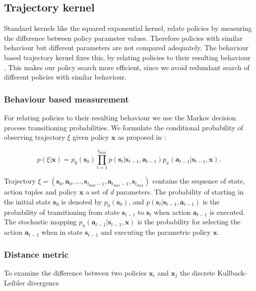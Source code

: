 \subsection{Trajectory kernel}\label{sec:trajKernel}
Standard kernels like the squared exponential kernel, relate policies by measuring the difference between policy parameter values. Therefore policies with similar behaviour but different parameters are not compared adequately. The behaviour based trajectory kernel fixes this, by relating policies to their resulting behaviour \cite{wilson2014using}. This makes our policy search more efficient, since we avoid redundant search of different policies with similar behaviour.

\subsubsection{Behaviour based measurement}

For relating policies to their resulting behaviour we use the Markov decision process transitioning probabilities. We formulate the conditional probability of observing trajectory $\xi$ given policy $\mathbf{x}$ as proposed in \cite{wilson2014using}:

$$p(\xi|\mathbf{x}) = p_{0}(\mathbf{s}_{0}) \prod_{t=1}^{t_\mathrm{max}} p(\mathbf{s}_{t}|\mathbf{s}_{t-1}, \mathbf{a}_{t-1}) p_{\pi}(\mathbf{a}_{t-1}|\mathbf{s}_{t-1}, \mathbf{x}).$$

Trajectory $\xi=(\mathbf{s}_{0},\mathbf{a}_{0}, ..., \mathbf{s}_{t_\mathrm{max}-1}, \mathbf{a}_{t_\mathrm{max}-1}, \mathbf{s}_{t_\mathrm{max}})$ contains the sequence of state, action tuples and policy $\mathbf{x}$ a set of $d$ parameters. The probability of starting in the initial state $\mathbf{s}_{0}$ is denoted by $p_{0}(\mathbf{s}_{0})$, and $p(\mathbf{s}_{t}|\mathbf{s}_{t-1}, \mathbf{a}_{t-1})$ is the probability of transitioning from state $\mathbf{s}_{t-1}$ to $\mathbf{s}_{t}$ when action $\mathbf{a}_{t-1}$ is executed. The stochastic mapping $p_{\pi}(\mathbf{a}_{t-1}|\mathbf{s}_{t-1},\mathbf{x})$ is the probability for selecting the action $\mathbf{a}_{t-1}$ when in state $\mathbf{s}_{t-1}$ and executing the parametric policy $\mathbf{x}$.

\subsubsection{Distance metric}
To examine the difference between two policies $\mathbf{x}_{ i }$ and $\mathbf{x}_{ j }$ the discrete Kullback-Leibler divergence

